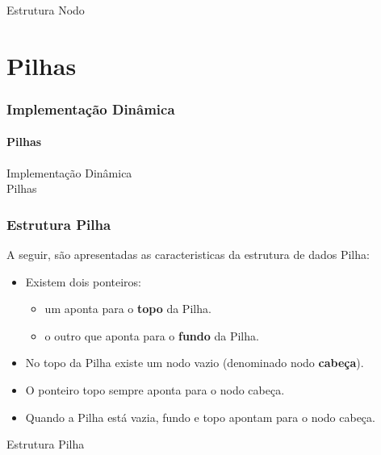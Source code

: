 \documentclass[aspectratio=169]{beamer}
\begin{document}
\begin{frame}[fragile]{Estrutura Nodo}
\begin{algorithm}[H]
\caption{Nodo} 
\label{Nodo}
\end{algorithm} 
\end{frame}

\section{Pilhas}

\begin{frame}
\frametitle{Implementação Dinâmica}
\framesubtitle{Pilhas}
\centering
\huge{Implementação Dinâmica\\
Pilhas
}
\end{frame}

\begin{frame}
\frametitle{Estrutura Pilha}
A seguir, são apresentadas as caracteristicas da estrutura de dados Pilha:
\begin{itemize}
 \item Existem dois ponteiros:
 \begin{itemize}
    \item um aponta para o {\bf topo} da Pilha.
    \item o outro que aponta para o {\bf fundo} da Pilha.
 \end{itemize}
 \item No topo da Pilha existe um nodo vazio (denominado nodo {\bf cabeça}).
 \item O ponteiro topo sempre aponta para o nodo cabeça.
 \item Quando a Pilha está vazia, fundo e topo apontam para o nodo cabeça.
\end{itemize}
\end{frame}

\begin{frame}[fragile]{Estrutura Pilha}
\begin{algorithm}[H]
\caption{Pilha} 
\label{Pilha}
\end{algorithm} 
\end{frame}

% 
\end{document}
